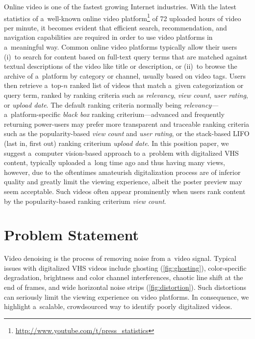 \documentclass[runningheads,a4paper]{llncs}
\begin{document}
Online video is one of the fastest growing Internet industries.
With the latest statistics of a~well-known online video
platform\footnote{\url{http://www.youtube.com/t/press_statistics}}
of 72 uploaded hours of video per minute,
it becomes evident that efficient search, recommendation, and
navigation capabilities are required in order to use 
video platforms in a~meaningful way. 
Common online video platforms typically allow their users
(i)~to search for content based on full-text query terms
that are matched against textual descriptions
of the video like title or description,
or (ii)~to browse the archive of a~platform by category or channel,
usually based on video tags.
Users then retrieve a~top-$n$ ranked list of videos
that match a~given categorization
or query term, ranked by ranking criteria such as
\emph{relevancy}, \emph{view count},
\emph{user rating}, or \emph{upload date}.
The default ranking criteria normally being
\emph{relevancy}---a~platform-specific \emph{black box}
ranking criterium---advanced and frequently returning power-users
may prefer more transparent and traceable ranking criteria
such as the popularity-based \emph{view count}
and \emph{user rating}, or the stack-based
LIFO (last in, first out) ranking criterium \emph{upload date}.
In this position paper, we suggest a~computer vision-based
approach to a~problem with digitalized VHS content,
typically uploaded a~long time ago and thus having many views,
however, due to the oftentimes amateurish digitalization process
are of inferior quality and greatly limit the viewing experience,
albeit the poster preview may seem acceptable.
Such videos often appear prominently when users rank content
by the popularity-based ranking criterium \emph{view count}.

\section{Problem Statement}

Video denoising is the process of removing noise from a~video signal.
Typical issues with digitalized VHS videos include 
ghosting (\autoref{fig:ghosting}),
color-specific degradation,
brightness and color channel interferences,
chaotic line shift at the end of frames,
and wide horizontal noise strips (\autoref{fig:distortion}).
Such distortions can seriously limit the viewing experience
on video platforms.
In consequence, we highlight a~scalable, crowdsourced way
to identify poorly digitalized videos.
\end{document}
